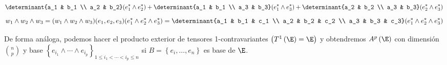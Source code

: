 \begin{example}
\[    \]
    \[
        \determinant{a_1        & b_1 \\
        a_2     & b_2}(e_1^* \wedge e_2^*) + \determinant{a_1   & b_1 \\
        a_3     & b_3}(e_1^* \wedge e_3^*) + \determinant{a_2   & b_2 \\
        a_3     & b_3}(e_2^* \wedge e_3^*)
    \]
    \[
        w_1 \wedge w_2 \wedge w_3 = (w_1 \wedge w_2 \wedge w_3) (e_1,e_2,e_3)
        (e_1^* \wedge e_2^* \wedge e_3^*) = \determinant{a_1    & b_1
        & c_1 \\
        a_2     & b_2   & c_2 \\
        a_3     & b_3   & c_3} (e_1^* \wedge e_2^* \wedge e_3^*)
    \]
\end{example}

\begin{obs}
    De forma análoga, podemos hacer el producto exterior de tensores
    1-contravariantes $ \left( T^1 \left( \E \right) = \E \right) $ y
    obtendremos $ A^p\left( \E \right) $ con dimensión $ \binom{n}{p} $
    y base
    \break
    $ \left\{ e_{i_1} \wedge \cdots \wedge e_{i_p} \right\}_{1 \leq i_1
    < \cdots < i_p \leq n} $ si $ B=\left\{e_i, \dots , e_n\right\} $ es
    base de $ \E $.
\end{obs}

